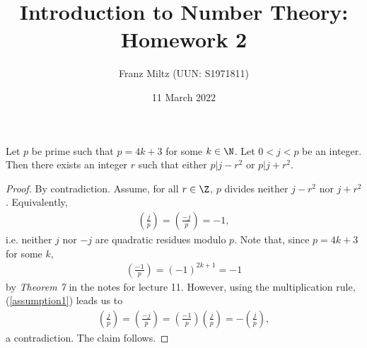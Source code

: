 \documentclass{article}
\begin{document}
\title{Introduction to Number Theory: Homework 2}
\author{Franz Miltz (UUN: S1971811)}
\date{11 March 2022}
\maketitle

\begin{claim*}[1]
   Let $p$ be prime such that $p=4k+3$ for some $k\in\N$. Let $0<j<p$ be an integer. Then 
   there exists an integer $r$ such that either $p|j-r^2$ or $p|j+r^2$.
   \begin{proof}
      By contradiction. Assume, for all $r\in\Z$, $p$ divides neither $j-r^2$ nor $j+r^2$. 
      Equivalently, 
      \begin{align}
         \label{assumption1}
         \left(\frac{j}{p}\right)=\left(\frac{-j}{p}\right)=-1,
      \end{align}
      i.e. neither $j$ nor $-j$ are quadratic residues modulo $p$. Note that, since $p=4k+3$
      for some $k$, 
      \begin{align}
         \label{minus_one}
         \left(\frac{-1}{p}\right)=(-1)^{2k+1}=-1
      \end{align}
      by \emph{Theorem 7} in the notes for lecture 11. However, using the multiplication rule,
      (\ref{assumption1}) leads us to
      \begin{align*}
         \left(\frac{j}{p}\right) = \left(\frac{-j}{p}\right) 
                                  = \left(\frac{-1}{p}\right)\left(\frac{j}{p}\right)
                                  = -\left(\frac{j}{p}\right),
      \end{align*}
      a contradiction. The claim follows.
   \end{proof}
\end{claim*}
\end{document}
